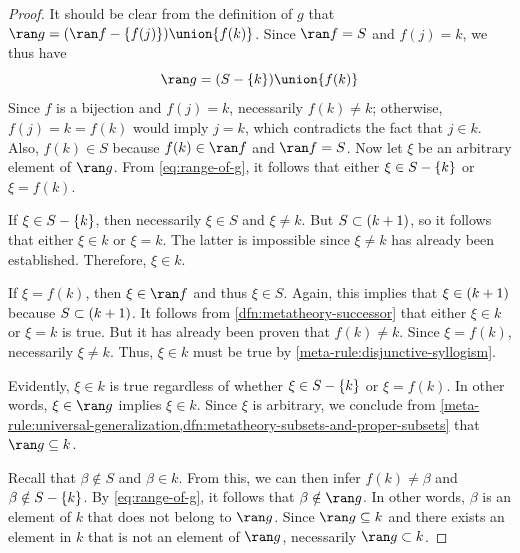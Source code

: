 \begin{proof}
    \vspace{0.3cm}
    \noindent
    It should be clear from the definition of \( g \) that \( \ran g = \mleft( \ran f - \mleft\{ f(j) \mright\} \mright) \union \mleft\{ f(k) \mright\} \).
    Since \( \ran f = S \) and \( f(j) = k \), we thus have
    \begin{equation}
        \label{eq:range-of-g}
        \ran g = \mleft( S - \mleft\{ k \mright\} \mright) \union \mleft\{ f(k) \mright\}
    \end{equation}
    Since \( f \) is a bijection and \( f(j) = k \), necessarily \( f(k) \neq k \);
    otherwise, \( f(j) = k = f(k)\) would imply \( j = k \), which contradicts the fact that \( j \in k \).
    Also, \( f(k) \in S \) because \( f(k) \in \ran f \) and \( \ran f = S \).
    Now let \( \xi \) be an arbitrary element of \( \ran g \).
    From \eqref{eq:range-of-g}, it follows that either \( \xi \in S - \mleft\{ k \mright\} \) or \( \xi = f(k) \).

    \vspace{0.3cm}
    \noindent
    If \( \xi \in S - \mleft\{ k \mright\} \), then necessarily \( \xi \in S \) and \( \xi \neq k \).
    But \( S \subset \mleft( k + 1 \mright) \), so it follows that either \( \xi \in k \) or \( \xi = k \).
    The latter is impossible since \( \xi \neq k \) has already been established.
    Therefore, \( \xi \in k \).

    \vspace{0.3cm}
    \noindent
    If \( \xi = f(k) \), then \( \xi \in \ran f \) and thus \( \xi \in S \).
    Again, this implies that \( \xi \in \mleft( k + 1 \mright) \) because \( S \subset \mleft( k + 1 \mright) \).
    It follows from \cref{dfn:metatheory-successor} that either \( \xi \in k \) or \( \xi = k \) is true.
    But it has already been proven that \( f(k) \neq k \).
    Since \( \xi = f(k) \), necessarily \( \xi \neq k \).
    Thus, \( \xi \in k \) must be true by \cref{meta-rule:disjunctive-syllogism}.

    \vspace{0.3cm}
    \noindent
    Evidently, \( \xi \in k \) is true regardless of whether \( \xi \in S - \mleft\{ k \mright\} \) or \( \xi = f(k) \).
    In other words, \( \xi \in \ran g \) implies \( \xi \in k \). Since \( \xi \) is arbitrary, we conclude from
    \cref{meta-rule:universal-generalization,dfn:metatheory-subsets-and-proper-subsets} that \( \ran g \subseteq k \).

    \vspace{0.3cm}
    \noindent
    Recall that \( \beta \notin S \) and \( \beta \in k \).
    From this, we can then infer \( f(k) \neq \beta \) and \( \beta \notin S - \mleft\{ k \mright\} \).
    By \eqref{eq:range-of-g}, it follows that \( \beta \notin \ran g \).
    In other words, \( \beta \) is an element of \( k \) that does not belong to \( \ran g \).
    Since \( \ran g \subseteq k \) and there exists an element in \( k \) that is not an element of \( \ran g \),
    necessarily \( \ran g \subset k \).


\end{proof}
